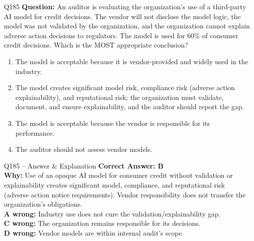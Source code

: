 \documentclass[aspectratio=169,10pt]{beamer}
\begin{document}
	\begin{frame}[t]{Q185}
		\small
		\textbf{Question:} An auditor is evaluating the organization's use of a third-party AI model for credit decisions. The vendor will not disclose the model logic, the model was not validated by the organization, and the organization cannot explain adverse action decisions to regulators. The model is used for 60\% of consumer credit decisions. Which is the MOST appropriate conclusion?
		\begin{enumerate}[label=\Alph*.,itemsep=1pt,topsep=2pt]
			\item The model is acceptable because it is vendor-provided and widely used in the industry.
			\item The model creates significant model risk, compliance risk (adverse action explainability), and reputational risk; the organization must validate, document, and ensure explainability, and the auditor should report the gap.
			\item The model is acceptable because the vendor is responsible for its performance.
			\item The auditor should not assess vendor models.
		\end{enumerate}
	\end{frame}
	
	\begin{frame}[t]{Q185 -- Answer \& Explanation}
		\small
		\textbf{Correct Answer: B} \\[4pt]
		\textbf{Why:} Use of an opaque AI model for consumer credit without validation or explainability creates significant model, compliance, and reputational risk (adverse action notice requirements). Vendor responsibility does not transfer the organization's obligations. \\[4pt]
		\textbf{A wrong:} Industry use does not cure the validation/explainability gap. \\[2pt]
		\textbf{C wrong:} The organization remains responsible for its decisions. \\[2pt]
		\textbf{D wrong:} Vendor models are within internal audit's scope.
	\end{frame}
	
\end{document}
